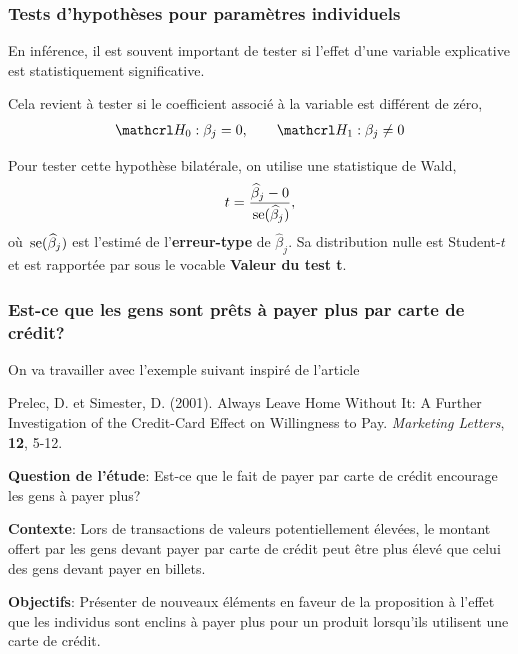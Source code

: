 \documentclass[xcolor={dvipsnames}]{beamer}
\begin{document}
 \begin{frame}
\frametitle{Tests d'hypothèses pour paramètres individuels}
\bi
\item En inférence, il est souvent important de tester si l'effet d'une variable explicative est statistiquement significative. 
\item Cela revient à tester si le coefficient associé à la variable est différent de zéro,
\begin{align*}
\Hy_0: \beta_j=0,  \qquad  \Hy_1: \beta_j\neq 0                                               \end{align*}
\item Pour tester cette hypothèse bilatérale, on utilise une statistique de Wald,
\begin{align*}
t=\frac{\widehat{\beta}_j-0}{\,\mathrm{se}(\widehat{\beta}_j)}, 
\end{align*}
où $\,\mathrm{se}(\widehat{\beta}_j)$ est l'estimé de l'\textbf{erreur-type} de $\widehat{\beta}_j$. Sa distribution nulle est Student-$t$ et est rapportée par \SASlang sous le vocable \textbf{Valeur du test t}.
\ei
\end{frame}

\begin{frame}
\frametitle{Est-ce que les gens sont prêts à payer plus par carte de crédit?}
On va travailler avec l'exemple suivant inspiré de l'article
\begin{tcolorbox}[colback=lightgray!30!white,colframe=lightgray!75!black,title=Référence]
Prelec, D. et Simester, D. (2001). Always Leave Home Without It: A Further Investigation of the Credit-Card Effect on Willingness to Pay. \textit{Marketing Letters}, \textbf{12}, 5-12.
\end{tcolorbox}
\bi

\item \alert{\textbf{Question de l'étude}}: Est-ce que le fait de payer par carte de crédit encourage les gens à payer plus?
\item \textbf{Contexte}: Lors de transactions de valeurs potentiellement élevées, le montant offert par les gens devant payer par carte de crédit peut être plus élevé que celui des gens devant payer en billets.
\item \textbf{Objectifs}: Présenter de nouveaux éléments en faveur de la proposition à l'effet que les individus sont enclins à payer plus pour un produit lorsqu'ils utilisent une carte de crédit. 
\ei
\end{frame}
\end{document}
